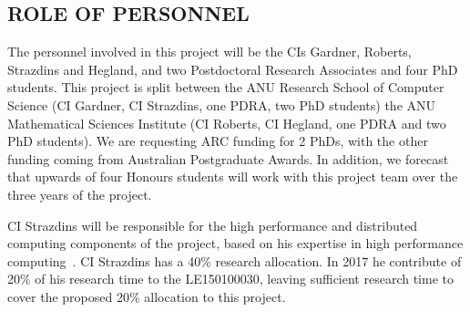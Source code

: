 
\subsection*{ROLE OF PERSONNEL}

%

The personnel involved in this project will be the CIs Gardner,
Roberts, Strazdins and Hegland, 
and
two Postdoctoral Research Associates and four PhD students.  This
project is split between the ANU Research School of Computer Science
(CI Gardner, CI Strazdins, one PDRA, two PhD students) the ANU
Mathematical Sciences Institute (CI Roberts, CI Hegland, one PDRA and
two PhD students).
We are requesting ARC funding for 2 PhDs, with the other funding coming 
from Australian Postgraduate Awards.  
In addition, we forecast that upwards of
four Honours students will work with this project team over the three
years of the project.

CI Strazdins will be
responsible for the high performance and distributed computing
components of the project, based on his expertise in high performance
computing~\parencite{AliEtal2015,StrazdinsEtal2015,Ali11022016}.  
CI Strazdins has a 40\% research allocation. In 2017 he contribute of 20\% of his research time to the LE150100030, leaving sufficient research time to cover the proposed 20\% allocation to this project. 

